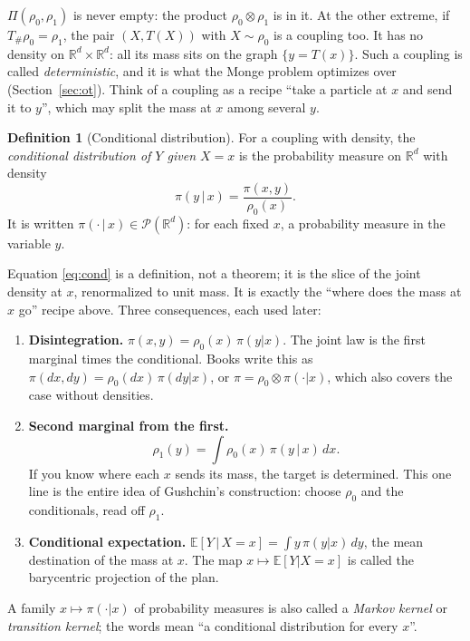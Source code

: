 \documentclass[11pt]{article}
\newcommand{\R}{\mathbb{R}}
\newcommand{\E}{\mathbb{E}}
\newcommand{\Pc}{\mathcal{P}}
\theoremstyle{definition}
\newtheorem{definition}{Definition}[section]
\theoremstyle{plain}
\begin{document}
$\Pi(\rho_0,\rho_1)$ is never empty: the product $\rho_0\otimes\rho_1$ is in it. At the
other extreme, if $T_\#\rho_0=\rho_1$, the pair $(X,T(X))$ with $X\sim\rho_0$ is a coupling
too. It has no density on $\R^d\times\R^d$: all its mass sits on the graph $\{y=T(x)\}$.
Such a coupling is called \emph{deterministic}, and it is what the Monge problem optimizes
over (Section~\ref{sec:ot}). Think of a coupling as a recipe ``take a particle at $x$ and
send it to $y$'', which may split the mass at $x$ among several $y$.

\begin{definition}[Conditional distribution]
For a coupling with density, the \emph{conditional distribution of $Y$ given $X=x$} is the
probability measure on $\R^d$ with density
\begin{equation}
  \label{eq:cond}
  \pi(y\,|\,x)=\frac{\pi(x,y)}{\rho_0(x)} .
\end{equation}
It is written $\pi(\cdot\,|\,x)\in\Pc(\R^d)$: for each fixed $x$, a probability measure in
the variable $y$.
\end{definition}
Equation \eqref{eq:cond} is a definition, not a theorem; it is the slice of the joint
density at $x$, renormalized to unit mass. It is exactly the ``where does the mass at $x$ go''
recipe above. Three consequences, each used later:
\begin{enumerate}
  \item \textbf{Disintegration.} $\pi(x,y)=\rho_0(x)\,\pi(y|x)$. The joint law is the first
        marginal times the conditional. Books write this as $\pi(dx,dy)=\rho_0(dx)\,\pi(dy|x)$,
        or $\pi=\rho_0\otimes\pi(\cdot|x)$, which also covers the case without densities.
  \item \textbf{Second marginal from the first.}
        \begin{equation}
          \label{eq:mixture}
          \rho_1(y)=\int\rho_0(x)\,\pi(y\,|\,x)\,dx .
        \end{equation}
        If you know where each $x$ sends its mass, the target is determined. This one line
        is the entire idea of Gushchin's construction: choose $\rho_0$ and the conditionals,
        read off $\rho_1$.
  \item \textbf{Conditional expectation.} $\E[Y\,|\,X=x]=\int y\,\pi(y|x)\,dy$, the mean
        destination of the mass at $x$. The map $x\mapsto\E[Y|X=x]$ is called the
        barycentric projection of the plan.
\end{enumerate}
A family $x\mapsto\pi(\cdot|x)$ of probability measures is also called a \emph{Markov kernel}
or \emph{transition kernel}; the words mean ``a conditional distribution for every $x$''.
\end{document}
